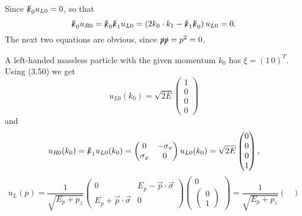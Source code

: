 \solution
\begin{problembody}
    \item Since $\slashed{k}_0 u_{L0} = 0$, so that
    \begin{equation*}
        \slashed{k}_0 u_{R0} = \slashed{k}_0 \slashed{k}_1 u_{L0} = \left(2k_0 \cdot k_1 - \slashed{k}_1 \slashed{k}_0\right) u_{L0} = 0.
    \end{equation*}
    The next two equations are obvious, since $\slashed{p}\slashed{p} = p^2 = 0$.

    \item A left-handed massless particle with the given momentum $k_0$ has $\xi = (1 \, 0)^T$. Using (3.50) we get
    \begin{equation*}
        u_{L0}(k_0) = \sqrt{2E} \begin{pmatrix}
            1\\ 0\\ 0\\ 0
        \end{pmatrix}
    \end{equation*}
    and
    \begin{equation*}
        u_{R0}(k_0) = \slashed{k}_1 u_{L0}(k_0) = \begin{pmatrix}
            0 & -\sigma_x \\
            \sigma_x & 0
        \end{pmatrix} u_{L0}(k_0) = \sqrt{2E}\begin{pmatrix}
            0 \\ 0 \\ 0 \\ 1
        \end{pmatrix},
    \end{equation*}
    \begin{equation*}
        u_L(p) = \frac{1}{\sqrt{E_p + p_z}} \begin{pmatrix}
            0 & E_p - \vec{p}\cdot\vec{\sigma} \\
            E_p + \vec{p}\cdot\vec{\sigma} & 0
        \end{pmatrix} \begin{pmatrix}
            0 \\
            \begin{pmatrix}
                0 \\ 1
            \end{pmatrix}
        \end{pmatrix} = \frac{1}{\sqrt{E_p + p_z}} \begin{pmatrix}

\end{pmatrix}
\end{equation*}
\end{problembody}
